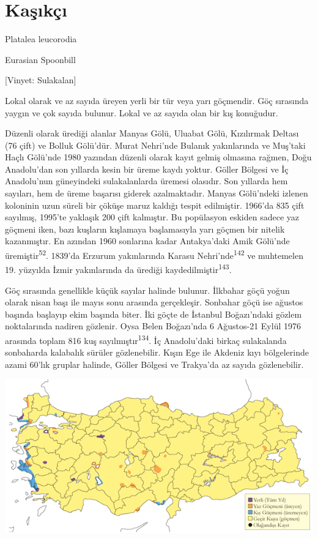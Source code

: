 \documentclass[
  letterpaper,
  DIV=11,
  numbers=noendperiod]{scrreprt}
\begin{document}
\section{Kaşıkçı}\label{kaux15fux131kuxe7ux131}

Platalea leucorodia

Eurasian Spoonbill

{[}Vinyet: Sulakalan{]}

Lokal olarak ve az sayıda üreyen yerli bir tür veya yarı göçmendir. Göç
sırasında yaygın ve çok sayıda bulunur. Lokal ve az sayıda olan bir kış
konuğudur.

Düzenli olarak ürediği alanlar Manyas Gölü, Uluabat Gölü, Kızılırmak
Deltası (76 çift) ve Bolluk Gölü'dür. Murat Nehri'nde Bulanık
yakınlarında ve Muş'taki Haçlı Gölü'nde 1980 yazından düzenli olarak
kayıt gelmiş olmasına rağmen, Doğu Anadolu'dan son yıllarda kesin bir
üreme kaydı yoktur. Göller Bölgesi ve İç Anadolu'nun güneyindeki
sulakalanlarda üremesi olasıdır. Son yıllarda hem sayıları, hem de üreme
başarısı giderek azalmaktadır. Manyas Gölü'ndeki izlenen koloninin uzun
süreli bir çöküşe maruz kaldığı tespit edilmiştir. 1966'da 835 çift
sayılmış, 1995'te yaklaşık 200 çift kalmıştır. Bu popülasyon eskiden
sadece yaz göçmeni iken, bazı kuşların kışlamaya başlamasıyla yarı
göçmen bir nitelik kazanmıştır. En azından 1960 sonlarına kadar
Antakya'daki Amik Gölü'nde üremiştir\textsuperscript{52}. 1839'da
Erzurum yakınlarında Karasu Nehri'nde\textsuperscript{142} ve muhtemelen
19. yüzyılda İzmir yakınlarında da ürediği
kaydedilmiştir\textsuperscript{143}.

Göç sırasında genellikle küçük sayılar halinde bulunur. İlkbahar göçü
yoğun olarak nisan başı ile mayıs sonu arasında gerçekleşir. Sonbahar
göçü ise ağustos başında başlayıp ekim başında biter. İki göçte de
İstanbul Boğazı'ndaki gözlem noktalarında nadiren gözlenir. Oysa Belen
Boğazı'nda 6 Ağustos-21 Eylül 1976 arasında toplam 816 kuş
sayılmıştır\textsuperscript{134}. İç Anadolu'daki birkaç sulakalanda
sonbaharda kalabalık sürüler gözlenebilir. Kışın Ege ile Akdeniz kıyı
bölgelerinde azami 60'lık gruplar halinde, Göller Bölgesi ve Trakya'da
az sayıda gözlenebilir.

\includegraphics{images/harita_Page_063.png}
\end{document}
